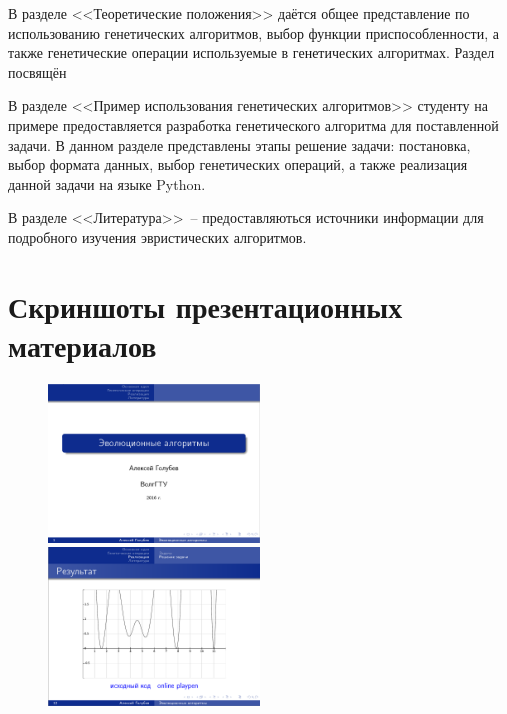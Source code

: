\documentclass[a4paper, 14pt]{extreport}
\begin{document}
    В разделе <<Теоретические положения>> даётся общее представление по использованию генетических алгоритмов, 
    выбор функции приспособленности, а также генетические операции используемые в генетических алгоритмах. Раздел 
    посвящён 

    В разделе <<Пример использования генетических алгоритмов>> студенту на примере предоставляется разработка 
    генетического алгоритма для поставленной задачи. В данном разделе представлены этапы решение задачи: постановка, 
    выбор формата данных, выбор генетических операций, а также реализация данной задачи на языке Python.

    В разделе <<Литература>>~-- предоставляються источники информации для подробного изучения эвристических алгоритмов. 

    \section{Скриншоты презентационных материалов}
    \vspace*{-2em}\begin{figure}[ht!]
        \center
        \includegraphics[width=0.5\textwidth]{p1}
        \includegraphics[width=0.5\textwidth]{p2}
    \end{figure}

    \newpage
\end{document}
